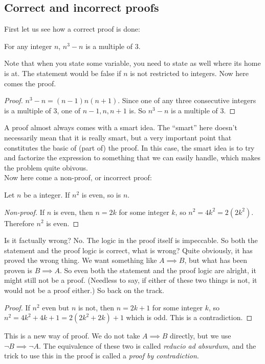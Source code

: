 \subsection{Correct and incorrect proofs}
First let us see how a correct proof is done:
\begin{claim}
    For any integer $n$, $n^3-n$ is a multiple of $3$.
\end{claim}
Note that when you state some variable, you need to state as well where its home is at.
The statement would be false if $n$ is not restricted to integers.
Now here comes the proof.
\begin{proof}
    $n^3-n=(n-1)n(n+1)$. Since one of any three consecutive integers is a multiple of $3$, one of $n-1,n,n+1$ is. So $n^3-n$ is a multiple of $3$.
\end{proof}
A proof almost always comes with a smart idea.
The ``smart'' here doesn't necessarily mean that it is really smart, but a very important point that constitutes the basic of (part of) the proof.
In this case, the smart idea is to try and factorize the expression to something that we can easily handle, which makes the problem quite obivous.\\
Now here come a non-proof, or incorrect proof:
\begin{claim}
    Let $n$ be a integer. If $n^2$ is even, so is $n$.
\end{claim}
\begin{proof}[Non-proof]
    If $n$ is even, then $n=2k$ for some integer $k$, so $n^2=4k^2=2(2k^2)$. Therefore $n^2$ is even.
\end{proof}
Is it factually wrong? No.
The logic in the proof itself is impeccable.
So both the statement and the proof logic is correct, what is wrong?
Quite obviously, it has proved the wrong thing.
We want something like $A\implies B$, but what has been proven is $B\implies A$.
So even both the statement and the proof logic are alright, it might still not be a proof.
(Needless to say, if either of these two things is not, it would not be a proof either.)
So back on the track.
\begin{proof}
    If $n^2$ even but $n$ is not, then $n=2k+1$ for some integer $k$, so $n^2=4k^2+4k+1=2(2k^2+2k)+1$ which is odd. This is a contradiction.
\end{proof}
This is a new way of proof. We do not take $A\implies B$ directly, but we use $\lnot B\implies\lnot A$.
The equivalence of these two is called \textit{reducio ad absurdum}, and the trick to use this in the proof is called a \textit{proof by contradiction}.

